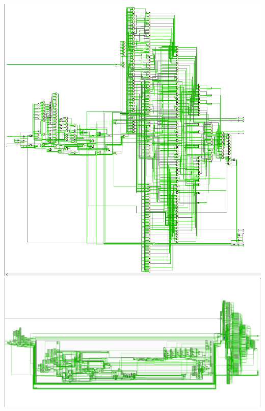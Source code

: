 \documentclass[a0,landscape]{a0poster}
\begin{document}
\begin{multicols}{3}
\begin{vwcol}[widths={0.4,0.6}]
\includegraphics[scale=0.5]{fpga_synth1}
\includegraphics[scale=0.4]{fpga_synth_canexpand}
\end{vwcol}


\end{multicols}
\end{document}
